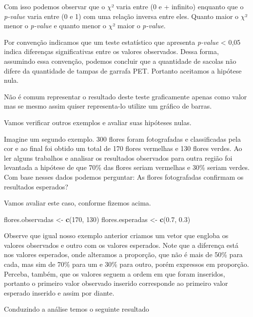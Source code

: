 \documentclass[titlepage, oneside, openany, a4paper]{book}
\newenvironment{Shaded}{\begin{snugshade}}{\end{snugshade}}
\newcommand{\DecValTok}[1]{\textcolor[rgb]{0.00,0.00,0.81}{#1}}
\newcommand{\FloatTok}[1]{\textcolor[rgb]{0.00,0.00,0.81}{#1}}
\newcommand{\KeywordTok}[1]{\textcolor[rgb]{0.13,0.29,0.53}{\textbf{#1}}}
\newcommand{\NormalTok}[1]{#1}
\newcommand{\StringTok}[1]{\textcolor[rgb]{0.31,0.60,0.02}{#1}}
\begin{document}
Com isso podemos observar que o \(\chi\)² varia entre (0 e + infinito) enquanto que o \emph{p-value} varia entre (0 e 1) com uma relação inversa entre eles. Quanto maior o \(\chi\)² menor o \emph{p-value} e quanto menor o \(\chi\)² maior o \emph{p-value}.

Por convenção indicamos que um teste estatístico que apresenta \emph{p-value} \textless{} 0,05 indica diferenças significativas entre os valores observados. Dessa forma, assumindo essa convenção, podemos concluir que a quantidade de sacolas não difere da quantidade de tampas de garrafa PET. Portanto aceitamos a hipótese nula.

Não é comum representar o resultado deste teste graficamente apenas como valor mas se mesmo assim quiser representa-lo utilize um gráfico de barras.

Vamos verificar outros exemplos e avaliar suas hipóteses nulas.

Imagine um segundo exemplo. 300 flores foram fotografadas e classificadas pela cor e ao final foi obtido um total de 170 flores vermelhas e 130 flores verdes. Ao ler alguns trabalhos e analisar os resultados observados para outra região foi levantada a hipótese de que 70\% das flores seriam vermelhas e 30\% seriam verdes. Com base nesses dados podemos perguntar: As flores fotografadas confirmam os resultados esperados?

Vamos avaliar este caso, conforme fizemos acima.

\begin{Shaded}
\begin{Highlighting}[]
\NormalTok{flores.observadas <-}\StringTok{ }\KeywordTok{c}\NormalTok{(}\DecValTok{170}\NormalTok{, }\DecValTok{130}\NormalTok{)}
\NormalTok{flores.esperadas <-}\StringTok{ }\KeywordTok{c}\NormalTok{(}\FloatTok{0.7}\NormalTok{, }\FloatTok{0.3}\NormalTok{)}
\end{Highlighting}
\end{Shaded}

Observe que igual nosso exemplo anterior criamos um vetor que engloba os valores observados e outro com os valores esperados. Note que a diferença está nos valores esperados, onde alteramos a proporção, que não é mais de 50\% para cada, mas sim de 70\% para um e 30\% para outro, porém expressos em proporção. Perceba, também, que os valores seguem a ordem em que foram inseridos, portanto o primeiro valor observado inserido corresponde ao primeiro valor esperado inserido e assim por diante.

Conduzindo a análise temos o seguinte resultado
\end{document}
